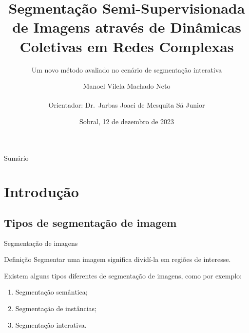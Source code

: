 \documentclass{templatebeamerufc/libs/ufc_format}
\title[EGSIS]{\textbf{Segmentação Semi-Supervisionada de Imagens através de
Dinâmicas Coletivas em Redes Complexas}}
\subtitle{Um novo método avaliado no cenário de segmentação interativa}
\author[Manoel Vilela Machado Neto]{
  Manoel Vilela Machado Neto
  \\~\\
  Orientador: Dr.\ Jarbas Joaci de Mesquita Sá Junior
}
\institute[UFC]{
    \normalsize{\email{manoel.machado@alu.ufc.br}}
    \newline
    \department{Engenharia da Computação}
    \newline
    \ufc{}
}
\date{Sobral, 12 de dezembro de 2023}
\begin{document}

\begin{frame}{}
    \maketitle
\end{frame}

\begin{frame}[t, allowframebreaks]{Sumário}
  \tableofcontents[sections={1---2}]  %
    \framebreak{}
  \tableofcontents[sections={3---6}]  %
\end{frame}

\section{Introdução}

\subsection{Tipos de segmentação de imagem}

\begin{frame}{Segmentação de imagens}
  \begin{block}{Definição}
    Segmentar uma imagem significa dividí-la em regiões de interesse.
  \end{block}

  Existem alguns tipos diferentes de segmentação de imagens, como por
exemplo:
  \begin{enumerate}
    \item Segmentação semântica;
    \item Segmentação de instâncias;
    \item Segmentação interativa.
  \end{enumerate}
\end{frame}
\end{document}
